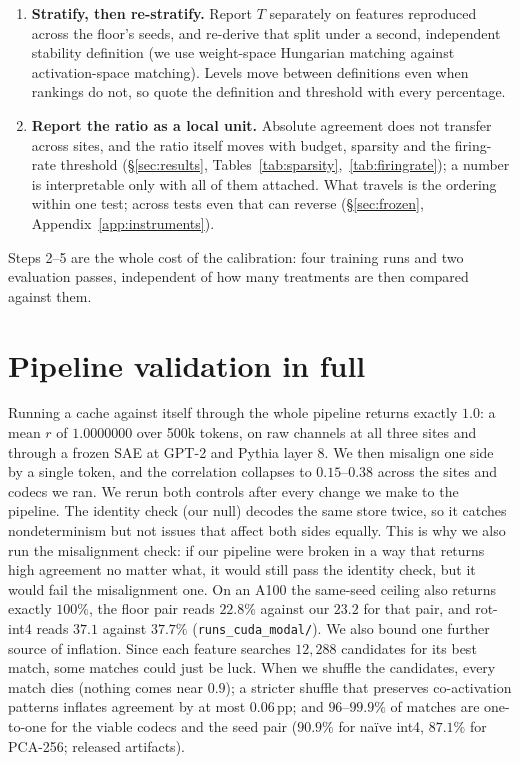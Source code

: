 \documentclass{article}
\begin{document}
\begin{enumerate}
  add: our own locality control moves it $2.6$\,pp at matched count,
  and we ran it once at one site.
  \item \textbf{Stratify, then re-stratify.} Report $T$ separately on
  features reproduced across the floor's seeds, and re-derive that split
  under a second, independent stability definition (we use weight-space
  Hungarian matching against activation-space matching). Levels move
  between definitions even when rankings do not, so quote the definition
  and threshold with every percentage.
  \item \textbf{Report the ratio as a local unit.} Absolute agreement
  does not transfer across sites, and the ratio itself moves with
  budget, sparsity and the firing-rate threshold (\S\ref{sec:results},
  Tables~\ref{tab:sparsity},~\ref{tab:firingrate});
  a number is interpretable only with all of them attached. What travels
  is the ordering within one test; across tests even
  that can reverse (\S\ref{sec:frozen}, Appendix~\ref{app:instruments}).
\end{enumerate}
Steps 2--5 are the whole cost of the calibration: four training runs and
two evaluation passes, independent of how many treatments are then
compared against them.

\section{Pipeline validation in full}
\label{app:validation}

Running a cache against itself through the whole pipeline returns
exactly $1.0$: a mean $r$ of $1.0000000$ over 500k tokens, on raw
channels at all three sites and through a frozen SAE at GPT-2 and
Pythia layer 8. We then misalign one side by a single token, and the
correlation collapses to $0.15$--$0.38$ across the sites and codecs we
ran. We rerun both controls after every change we make to the
pipeline. The identity check (our null) decodes the same store twice,
so it catches
nondeterminism but not issues that affect both sides equally.
This is why we also run the misalignment check: if our pipeline
were broken in a way that
returns high agreement no matter what, it would still pass
the identity check, but it would fail the misalignment one. On an A100
the same-seed ceiling also returns exactly $100\%$, the
floor pair reads $22.8\%$ against our $23.2$ for that pair, and rot-int4
reads $37.1$ against $37.7\%$ (\texttt{runs\_cuda\_modal/}). We also
bound one further source of inflation. Since each feature searches
$12{,}288$ candidates for its best match, some matches could just be
luck. When we shuffle the candidates, every match dies (nothing comes
near $0.9$); a stricter shuffle that preserves co-activation patterns
inflates agreement by at most $0.06$\,pp; and $96$--$99.9\%$ of matches are one-to-one for the viable codecs and
the seed pair ($90.9\%$ for na\"ive int4, $87.1\%$ for PCA-256;
released artifacts).
\end{document}
